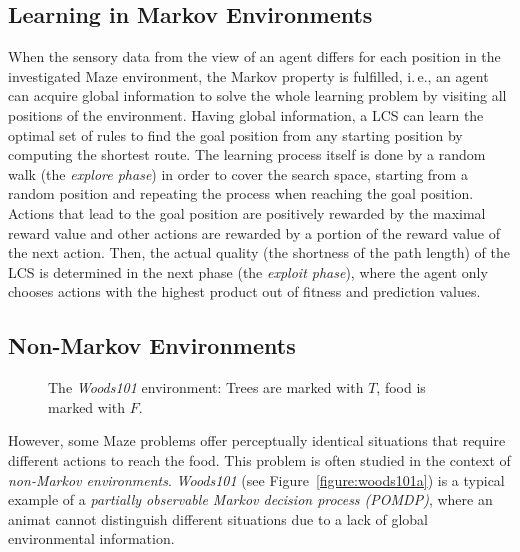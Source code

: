 \subsection{Learning in Markov Environments} %
\label{subsection:learning-markov}

When the sensory data from the view of an agent differs for each position in the investigated Maze environment, the Markov property is fulfilled, i.\,e., an agent can acquire global information to solve the whole learning problem by visiting all positions of the environment. Having global information, a LCS can learn the optimal set of rules to find the goal position from any starting position by computing the shortest route. The learning process itself is done by a random walk (the \emph{explore phase}) in order to cover the search space, starting from a random position and repeating the process when reaching the goal position. Actions that lead to the goal position are positively rewarded by the maximal reward value and other actions are rewarded by a portion of the reward value of the next action. Then, the actual quality (the shortness of the path length) of the LCS is determined in the next phase (the \emph{exploit phase}), where the agent only chooses actions with the highest product out of fitness and prediction values.


\subsection{Non-Markov Environments}

\label{subsection:non-markov-environments}
\begin{figure}[ht]
  \hfill
  \hfill
  \caption{The \emph{Woods101} environment: Trees are marked with $T$, food is marked with $F$.}
  \label{figure:woods101}
\end{figure}

However, some Maze problems offer perceptually identical situations that require different actions to reach the food. This problem is often studied in the context of \emph{non-Markov environments}. \emph{Woods101} (see Figure~\ref{figure:woods101a}) is a typical example of a \emph{partially observable Markov decision process (POMDP)}, where an animat cannot distinguish different situations due to a lack of global environmental information. 


